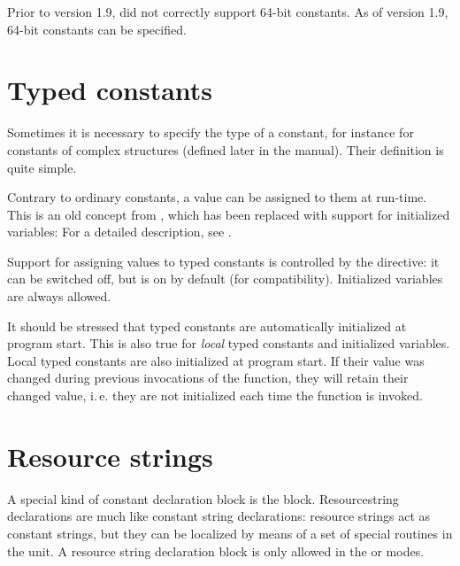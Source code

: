 Prior to version 1.9, \fpc did not correctly support 64-bit constants. As
of version 1.9, 64-bit constants can be specified.

\section{Typed constants}
\label{se:typedconstants}
Sometimes it is necessary to specify the type of a constant, for instance
for constants of complex structures (defined later in the manual).
Their definition is quite simple.



Contrary to ordinary constants, a value can be assigned to them at
run-time.  This is an old concept from \tp, which has been
replaced with  support for initialized variables: For a detailed
description, see .

Support for assigning values to typed constants is controlled by the
 directive: it can be switched off, but is on by default
(for \tp compatibility). Initialized variables are always allowed.

\begin{remark}
It should be stressed that typed constants are automatically initialized at program start.
This is also true for \emph{local} typed constants and initialized variables.
Local typed constants are also initialized at program start. If their value was
changed during previous invocations of the function, they will retain their
changed value, i.\,e. they are not initialized each time the function is invoked.
\end{remark}

\section{Resource strings}
\label{se:resourcestring}
A special kind of constant declaration block is the 
block. Resourcestring declarations are much like constant string
declarations: resource strings act as constant strings, but they
can be localized by means of a set of special routines in the
 unit. A resource string declaration block
is only allowed in the  or  modes.

